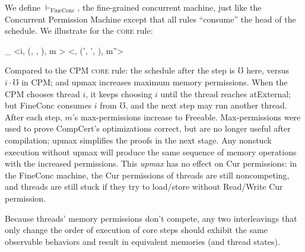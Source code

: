 \begin{definition}
  \label{def:fineconc}
We define $\vdash_\mathrm{FineConc}$, the fine-grained concurrent
machine, just like the Concurrent Permission Machine except that
all rules ``consume'' the head of the schedule.
We illustrate for the \textsc{core} rule:

\vspace{-2ex}
  {
\Psi \vdash_ 
\left<i\cdot\mho, (, \vec{\pi}, \lockpool), m \right>
\mapsto
\left<\mho, (', \vec{\pi}', \lockpool), m''\right>
  }
\end{definition}

\vspace{-2ex}
Compared to the CPM \textsc{core} rule:
the schedule after the step is $\mho$ here,
versus $i\cdot \mho$ in CPM;
and upmax increases maximum memory permissions.
When the CPM chooses thread $i$, it keeps choosing $i$
until the thread reaches atExternal; but FineConc
consumes $i$ from $\mho$, and the next step may run another
thread.  After each step, $m$'s max-permissions 
increase to Freeable.  Max-permissions were used
to prove CompCert's optimizations correct, but
are no longer useful after compilation;
upmax simplifies the proofs in the next stage.
Any nonstuck execution without upmax will produce the same
sequence of memory operations with the increased permissions.
This \emph{upmax} has no effect on Cur permissions:
in the FineConc machine, the Cur permissions of
threads are still noncompeting, and threads are still stuck
if they try to load/store without Read/Write Cur permission.

Because threads' memory permissions don't compete,
any two interleavings that only change the order of
execution of core steps should exhibit the same observable behaviors
and result in equivalent memories (and thread states).

